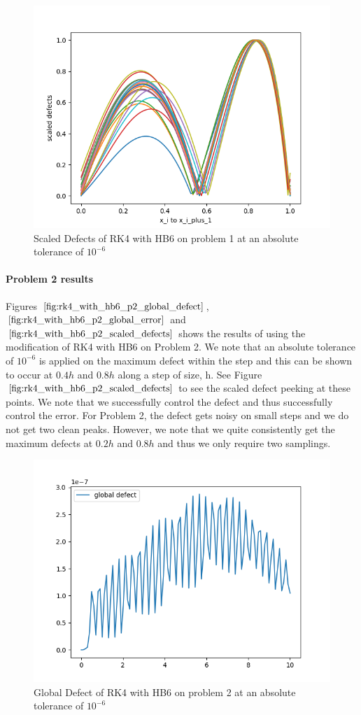 \documentclass{article}
\begin{document}
\begin{figure}[H]
\centering
\includegraphics[width=0.7\linewidth]{./figures/rk4_with_hb6_p1_scaled_defects}
\caption{Scaled Defects of RK4 with HB6 on problem 1 at an absolute tolerance of $10^{-6}$}
\label{fig:rk4_with_hb6_p1_scaled_defects}
\end{figure}

\paragraph{Problem 2 results}
Figures $\ref{fig:rk4_with_hb6_p2_global_defect}$, $\ref{fig:rk4_with_hb6_p2_global_error}$ and $\ref{fig:rk4_with_hb6_p2_scaled_defects}$ shows the results of using the modification of RK4 with HB6 on Problem 2. We note that an absolute tolerance of $10^{-6}$ is applied on the maximum defect within the step and this can be shown to occur at $0.4h$ and $0.8h$ along a step of size, h. See Figure $\ref{fig:rk4_with_hb6_p2_scaled_defects}$ to see the scaled defect peeking at these points. We note that we successfully control the defect and thus successfully control the error. For Problem 2, the defect gets noisy on small steps and we do not get two clean peaks. However, we note that we quite consistently get the maximum defects at $0.2h$ and $0.8h$ and thus we only require two samplings.

\begin{figure}[H]
\centering
\includegraphics[width=0.7\linewidth]{./figures/rk4_with_hb6_p2_global_defect}
\caption{Global Defect of RK4 with HB6 on problem 2 at an absolute tolerance of $10^{-6}$}
\label{fig:rk4_with_hb6_p2_global_defect}
\end{figure}
\end{document}
